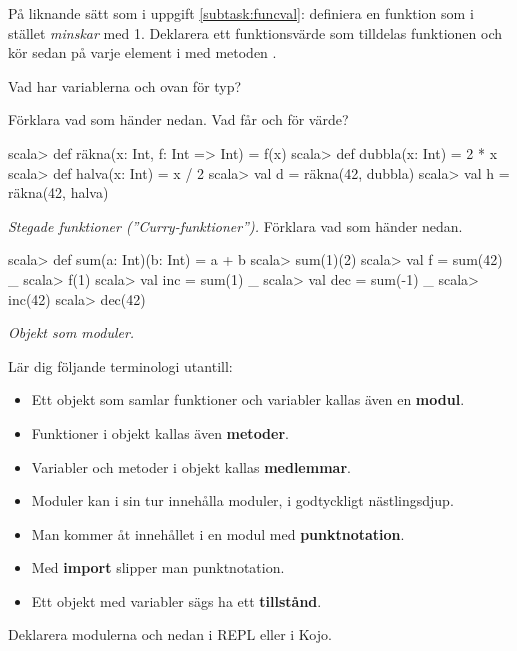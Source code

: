 \Subtask På liknande sätt som i uppgift \ref{subtask:funcval}: definiera en funktion  som i stället \emph{minskar} med 1. Deklarera ett funktionsvärde  som tilldelas funktionen  och kör sedan  på varje element i  med metoden .

\Subtask\Pen Vad har variablerna  och  ovan för typ?

\Subtask Förklara vad som händer nedan. Vad får  och  för värde?

\begin{REPL}
scala> def räkna(x: Int, f: Int => Int) = f(x)
scala> def dubbla(x: Int) = 2 * x
scala> def halva(x: Int) = x / 2
scala> val d = räkna(42, dubbla)
scala> val h = räkna(42, halva)
\end{REPL}

\Task\emph{Stegade funktioner (''Curry-funktioner'').} Förklara vad som händer nedan.
\begin{REPL}
scala> def sum(a: Int)(b: Int) = a + b
scala> sum(1)(2)
scala> val f = sum(42) _
scala> f(1)
scala> val inc = sum(1) _
scala> val dec = sum(-1) _
scala> inc(42)
scala> dec(42)
\end{REPL}

\Task \emph{Objekt som moduler.} 

\Subtask Lär dig följande terminologi utantill: 

\begin{itemize}[noitemsep, nolistsep]
\item Ett objekt som samlar funktioner och variabler kallas även en \textbf{modul}. 
\item Funktioner i objekt kallas även \textbf{metoder}. 
\item Variabler och metoder i objekt kallas \textbf{medlemmar}. 
\item Moduler kan i sin tur innehålla moduler, i godtyckligt nästlingsdjup. 
\item Man kommer åt innehållet i en modul med \textbf{punktnotation}. 
\item Med \textbf{import} slipper man punktnotation. 
\item Ett objekt med variabler sägs ha ett \textbf{tillstånd}.
\end{itemize}

\Subtask Deklarera modulerna  och  nedan i REPL eller i Kojo. 

